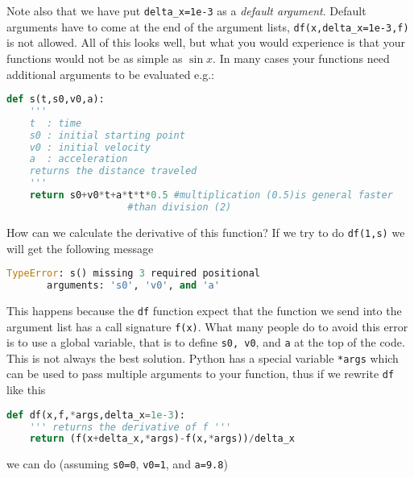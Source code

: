 \documentclass[graybox,sectrefs,envcountresetchap,open=right,final]{svmonodo}
\begin{document}
Note also that we have put \Verb!delta_x=1e-3! as a \emph{default argument}. Default arguments have to come at the end of the argument lists, \Verb!df(x,delta_x=1e-3,f)! is not allowed. All of this looks well, but what you would experience is that your functions would not be as simple as $\sin x$. In many cases your functions need additional arguments to be evaluated e.g.:











\begin{lstlisting}[language=python,style=blue1bar]
def s(t,s0,v0,a):
    '''
    t  : time
    s0 : initial starting point
    v0 : initial velocity
    a  : acceleration
    returns the distance traveled
    '''
    return s0+v0*t+a*t*t*0.5 #multiplication (0.5)is general faster
    	   		     #than division (2)

\end{lstlisting}

How can we calculate the derivative of this function? If we try to do \texttt{df(1,s)} we will get the following message



\begin{lstlisting}[language=python,style=blue1bar]
TypeError: s() missing 3 required positional
	   arguments: 's0', 'v0', and 'a'

\end{lstlisting}

This happens because the \texttt{df} function expect that the function we send into the argument list has a call signature \texttt{f(x)}. What many people do to avoid this error is to use a global variable, that is to define \texttt{s0, v0}, and \texttt{a} at the top of the code. This is not always the best solution. Python has a special variable \texttt{*args} which can be used to pass multiple arguments to your function, thus if we rewrite \texttt{df} like this




\begin{lstlisting}[language=python,style=blue1bar]
def df(x,f,*args,delta_x=1e-3):
    ''' returns the derivative of f '''
    return (f(x+delta_x,*args)-f(x,*args))/delta_x

\end{lstlisting}

we can do (assuming \texttt{s0=0}, \texttt{v0=1}, and \texttt{a=9.8})
\end{document}
